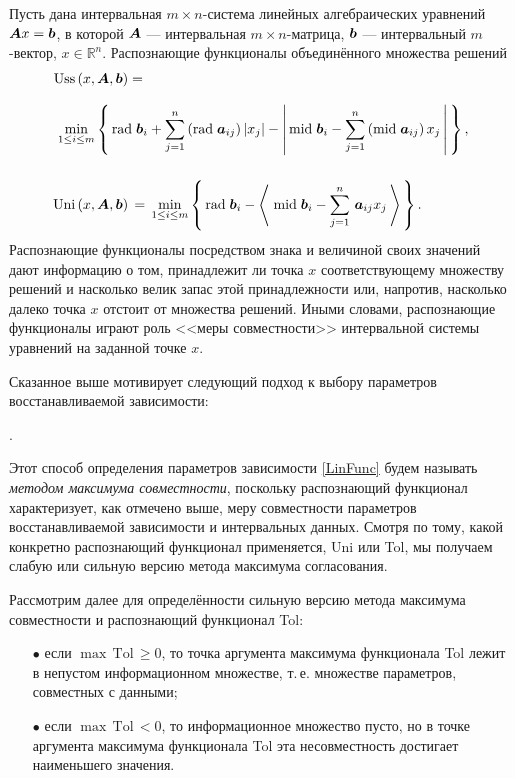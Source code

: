 \documentclass[a5paper,openany]{book}
\newcommand{\mbf}[1]{\protect\text{\boldmath$#1$}}
\newcommand{\mbb}{\mathbb}
\newcommand{\m}{\mathrm{mid}\;}
\newcommand{\Uni}{\mathrm{Uni}\,}
\newcommand{\Tol}{\mathrm{Tol}\,}
\newcommand{\Uss}{\mathrm{Uss}\,}
\renewcommand{\r}{\mathrm{rad}\;}
\begin{document}
Пусть дана интервальная $m\times n$-система линейных алгебраических уравнений $\mbf{A}x 
= \mbf{b}$, в которой $\mbf{A}$ --- интервальная $m\!\times\! n$-матрица, $\mbf{b}$ --- 
интервальный $m$-вектор, $x\in\mbb{R}^n$. Распознающие функционалы объединённого 
множества решений 
\begin{align} 
\Uss (x, & \,\mbf{A}, \mbf{b}) = \notag \\[-5pt] 
             \label{UssExpr}            \\[-2pt] 
\min_{1\leq i\leq m} & 
  \left\{\,\r\mbf{b}_i + \sum_{j=1}^n \,(\r\mbf{a}_{ij})\,|x_{j}| - 
  \left|\,\m\mbf{b}_i - \sum_{j=1}^n \,(\m\mbf{a}_{ij})\, x_j 
  \,\right|\,\right\}, \notag           \\[5mm]  
\Uni(x, & \,\mbf{A}, \mbf{b})\,  = \,\min_{1\leq i\leq m} 
  \left\{ \,\r\mbf{b}_i - \left\langle\; \m\mbf{b}_i - \sum_{j=1}^n 
  \,\mbf{a}_{ij} x_{j} \,\right\rangle \,\right\}.  
\end{align}
Распознающие функционалы посредством знака и величиной своих значений дают 
информацию о том, принадлежит ли точка $x$ соответствующему множеству решений 
и насколько велик запас этой принадлежности или, напротив, насколько далеко 
точка $x$ отстоит от множества решений. Иными словами, распознающие функционалы 
играют роль <<меры совместности>> интервальной системы уравнений на заданной 
точке $x$. 
  
Сказанное выше мотивирует следующий подход к выбору параметров восстанавливаемой 
зависимости: 
\begin{center}
\fboxsep=5pt 
{\color{magenta} 
}\;. 
\end{center} 
Этот способ определения параметров зависимости \eqref{LinFunc} будем называть 
\emph{методом максимума совместности}, поскольку распознающий функционал характеризует, 
как отмечено выше, меру совместности параметров восстанавливаемой зависимости и 
интервальных данных. Смотря по тому, какой конкретно распознающий функционал 
применяется, Uni или Tol, мы получаем слабую или сильную версию метода максимума 
согласования. 
  
Рассмотрим далее для определённости сильную версию метода максимума совместности 
и распознающий функционал Tol: 
\begin{itemize}
\item[\color{cyan}$\bullet$] 
если $\max\,\Tol \geq 0$, то точка аргумента максимума функционала Tol 
лежит в непустом информационном множестве, т.\,е. множестве параметров, 
совместных с данными; 
\item[\color{cyan}$\bullet$] 
если $\max\,\Tol < 0$, то информационное множество пусто, но в точке аргумента 
максимума функционала Tol эта несовместность достигает наименьшего значения. 
\end{itemize} 
  
\end{document}
